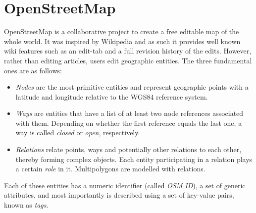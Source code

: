 
\section{OpenStreetMap}
\label{sec:OSM}

OpenStreetMap is a collaborative project to create a free editable map of the whole world.
It was inspired by Wikipedia and as such it provides well known wiki features such as an edit-tab and a full revision history of the edits.
However, rather than editing articles, users edit geographic entities.
The three fundamental ones are as follows:
\begin{itemize}
  \item \emph{Nodes} are the most primitive entities and represent
  geographic points with a latitude and longitude relative to the {WGS84}
  reference system.
  \item \emph{Ways} are entities that have a list of at least two node
  references associated with them. Depending on whether the first
  reference equals the last one, a way is called \emph{closed} or \emph{open}, respectively.
  \item \emph{Relations} relate points, ways and
  potentially other relations to each other, thereby forming complex objects.
  Each entity participating in a relation plays a certain \emph{role} in it.
	Multipolygons are modelled with relations.
\end{itemize}

Each of these entities has a numeric identifier (called \textit{OSM ID}), a set of generic attributes, and most importantly is described using a set of key-value pairs, known as \emph{tags}.

